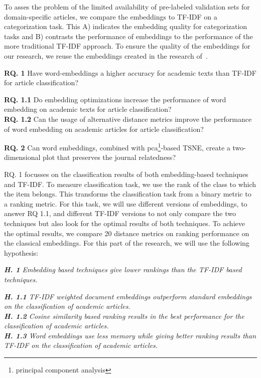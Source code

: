 \documentclass[../../Thesis.tex]{subfiles}
\begin{document}
To asses the problem of the limited availability of pre-labeled validation sets for domain-specific articles, we compare the embeddings to  TF-IDF on a categorization task. This A) indicates the embedding quality for categorization tasks and B) contrasts the performance of embeddings to the performance of the more traditional TF-IDF approach. To ensure the quality of the embeddings for our research, we reuse the embeddings created in the research of~\citet{Truong2017Thesis}.
\begin{jumpin}
    \textbf{RQ. 1} Have word-embeddings a higher accuracy for academic texts than TF-IDF for article classification?\\
    \begin{adjustwidth}{0.3in}{}
        \textbf{RQ. 1.1} Do embedding optimizations increase the performance of word embedding on academic texts for article classification?\\
        \textbf{RQ. 1.2} Can the usage of alternative distance metrics improve the performance of word embedding on academic articles for article classification?
    \end{adjustwidth}
    \vspace{0.1in}\textbf{RQ. 2} Can word embeddings, combined with pca\footnote{principal component analysis}-based TSNE, create a two-dimensional plot that preserves the journal relatedness?
\end{jumpin}
\clearpage
{}
RQ. 1 focusses on the classification results of both embedding-based techniques and TF-IDF.  To measure classification task, we use the rank of the class to which the item belongs. This transforms the classification task from a binary metric to a ranking metric. For this task, we will use different versions of embeddings, to answer RQ 1.1, and different TF-IDF versions to not only compare the two techniques but also look for the optimal results of both techniques. To achieve the optimal results, we compare 20 distance metrics on ranking performance on the classical embeddings. For this part of the research, we will use the following hypothesis:
\begin{jumpin}
\textit{\textbf{H. 1} Embedding based techniques give lower rankings than the TF-IDF based techniques.}
\begin{jumpin}
\textit{\textbf{H. 1.1} TF-IDF weighted document embeddings outperform standard embeddings on the classification of academic articles.}\\
\textit{\textbf{H. 1.2} Cosine similarity based ranking results in the best performance for the classification of academic articles.}\\
\textit{\textbf{H. 1.3} Word embeddings use less memory while giving better ranking results than TF-IDF on the classification of academic articles.}
\end{jumpin}
\end{jumpin}
\end{document}
